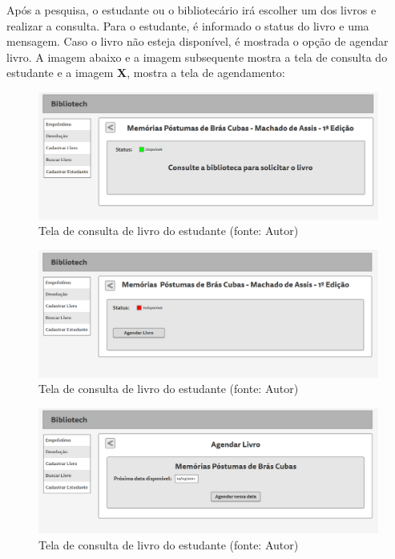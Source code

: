 Após a pesquisa, o estudante ou o bibliotecário irá escolher um dos livros e realizar a consulta. Para o estudante, é informado o status do livro e uma mensagem. Caso o livro não esteja disponível, é mostrada o opção de  agendar livro. A imagem abaixo e a imagem subsequente mostra a tela de consulta do estudante e a imagem \textbf{X}, mostra a tela de agendamento:

\begin{figure}[!h]
\centering
\includegraphics[scale=0.40, angle = 360]{figuras/prototipo6}
\caption[]{Tela de consulta de livro do estudante (fonte: Autor)}
\label{Tela de consulta de livro do estudante}
\end{figure}
\FloatBarrier

\begin{figure}[!h]
\centering
\includegraphics[scale=0.40, angle = 360]{figuras/prototipo7}
\caption[]{Tela de consulta de livro do estudante (fonte: Autor)}
\label{Tela de consulta de livro do estudante}
\end{figure}
\FloatBarrier

\begin{figure}[!h]
\centering
\includegraphics[scale=0.40, angle = 360]{figuras/prototipo8}
\caption[]{Tela de consulta de livro do estudante (fonte: Autor)}
\label{Tela de consulta de livro do estudante}
\end{figure}
\FloatBarrier

